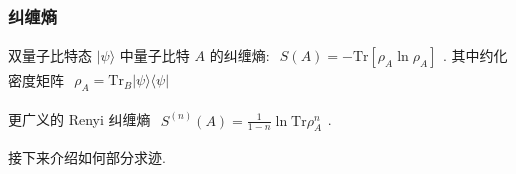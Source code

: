 \documentclass[../../main.tex]{subfiles}
\begin{document}
\subsubsection{纠缠熵}
双量子比特态 $|\psi\rangle$ 中量子比特 $A$ 的纠缠熵: $\begin{aligned}
    S(A) = -\text{Tr}[\rho_{A}\ln{\rho_{A}}]
\end{aligned}$. 其中约化密度矩阵 $\begin{aligned}
    \rho_{A} = \text{Tr}_{B}|\psi\rangle\langle\psi|
\end{aligned}$

更广义的 Renyi 纠缠熵 $\begin{aligned}
    S^{(n)}(A) = \frac{1}{1-n}\ln{\text{Tr}\rho_{A}^{n}}
\end{aligned}$. 

接下来介绍如何部分求迹. 
\end{document}
